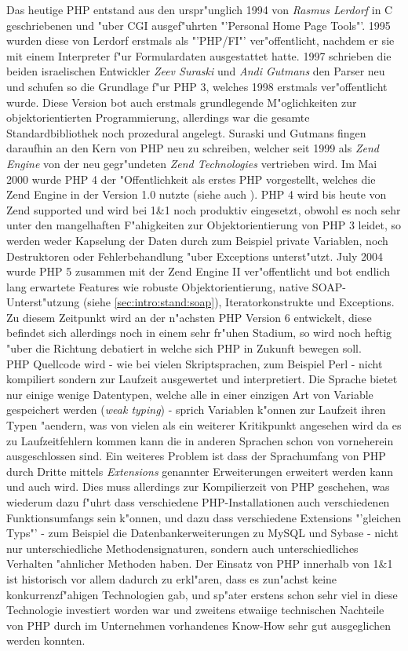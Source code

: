 Das heutige PHP entstand aus den urspr"unglich 1994 von \emph{Rasmus Lerdorf} in C geschriebenen und "uber CGI
ausgef"uhrten "'Personal Home Page Tools"'. 1995 wurden diese von Lerdorf erstmals als "'PHP/FI"' ver"offentlicht,
nachdem er sie mit einem Interpreter f"ur Formulardaten ausgestattet hatte.
1997 schrieben die beiden israelischen Entwickler \emph{Zeev Suraski} und \emph{Andi Gutmans} den Parser neu und
schufen so die Grundlage f"ur PHP 3, welches 1998 erstmals ver"offentlicht wurde. Diese Version bot auch 
erstmals grundlegende M"oglichkeiten zur objektorientierten Programmierung, allerdings war die gesamte 
Standardbibliothek noch prozedural angelegt.
Suraski und Gutmans fingen daraufhin an den Kern von PHP neu zu schreiben, welcher seit 1999 als \emph{Zend Engine}
von der neu gegr"undeten \emph{Zend Technologies} vertrieben wird. Im Mai 2000 wurde PHP 4 der
"Offentlichkeit als erstes PHP vorgestellt, welches die Zend Engine in der Version 1.0 nutzte (siehe auch \cite{ZENDENGINE}).
PHP 4 wird bis heute von Zend supported und wird bei 1\&1 noch produktiv eingesetzt, obwohl es noch sehr unter den
mangelhaften F"ahigkeiten zur Objektorientierung von PHP 3 leidet, so werden weder Kapselung der Daten durch 
zum Beispiel private Variablen, noch Destruktoren oder Fehlerbehandlung "uber Exceptions unterst"utzt.
July 2004 wurde PHP 5 zusammen mit der Zend Engine II ver"offentlicht und bot endlich lang erwartete Features wie
robuste Objektorientierung, native SOAP-Unterst"utzung (siehe \ref{sec:intro:stand:soap}), 
Iteratorkonstrukte und Exceptions. Zu diesem Zeitpunkt wird an der n"achsten PHP Version 6 entwickelt, diese
befindet sich allerdings noch in einem sehr fr"uhen Stadium, so wird noch heftig "uber die Richtung
debatiert in welche sich PHP in Zukunft bewegen soll.\\
PHP Quellcode wird - wie bei vielen Skriptsprachen, zum Beispiel Perl - nicht kompiliert sondern zur Laufzeit ausgewertet und interpretiert.
Die Sprache bietet nur einige wenige Datentypen, welche alle in einer einzigen Art von Variable gespeichert werden 
(\emph{weak typing}) - sprich Variablen k"onnen zur Laufzeit ihren Typen "aendern, was von vielen als ein weiterer
Kritikpunkt angesehen wird da es zu Laufzeitfehlern kommen kann die in anderen Sprachen schon von vorneherein 
ausgeschlossen sind. Ein weiteres Problem ist dass der Sprachumfang von PHP durch Dritte mittels \emph{Extensions}
genannter Erweiterungen erweitert werden kann und auch wird. Dies muss allerdings zur Kompilierzeit von PHP geschehen, was wiederum
dazu f"uhrt dass verschiedene PHP-Installationen auch verschiedenen Funktionsumfangs sein k"onnen, und dazu dass
verschiedene Extensions "'gleichen Typs"' - zum Beispiel die Datenbankerweiterungen zu MySQL und Sybase - nicht
nur unterschiedliche Methodensignaturen, sondern auch unterschiedliches Verhalten "ahnlicher Methoden haben.
Der Einsatz von PHP innerhalb von 1\&1 ist historisch vor allem dadurch zu erkl"aren, dass es zun"achst keine 
konkurrenzf"ahigen Technologien gab, und sp"ater erstens schon sehr viel in diese Technologie investiert
worden war und zweitens etwaiige technischen Nachteile von PHP durch im Unternehmen vorhandenes Know-How sehr gut
ausgeglichen werden konnten.


